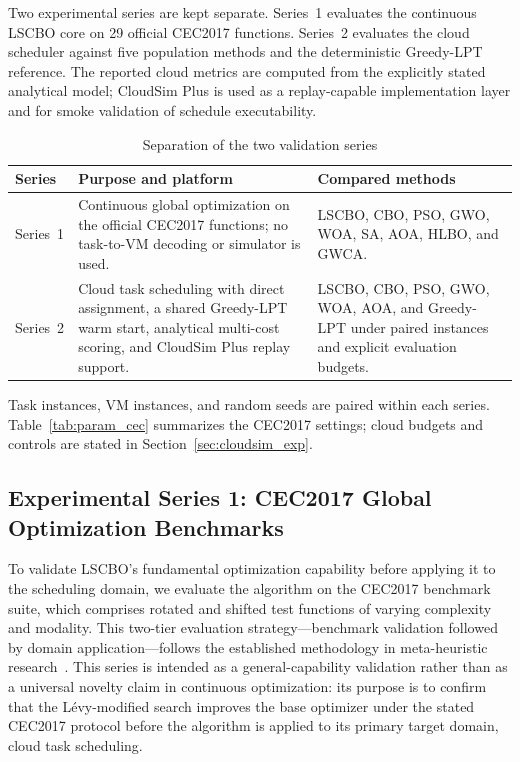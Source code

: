 \documentclass[pdflatex,onecolumn,sn-mathphys-num]{sn-jnl}
\begin{document}
Two experimental series are kept separate. Series~1 evaluates the continuous LSCBO core on 29 official CEC2017 functions. Series~2 evaluates the cloud scheduler against five population methods and the deterministic Greedy-LPT reference. The reported cloud metrics are computed from the explicitly stated analytical model; CloudSim Plus is used as a replay-capable implementation layer and for smoke validation of schedule executability.

\begin{table}[ht]
\centering
\caption{Separation of the two validation series}\label{tab:series_boundary}
\begin{tabular}{p{} p{} p{}}
\toprule
\textbf{Series} & \textbf{Purpose and platform} & \textbf{Compared methods} \\
\midrule
Series~1 & Continuous global optimization on the official CEC2017 functions; no task-to-VM decoding or simulator is used. & LSCBO, CBO, PSO, GWO, WOA, SA, AOA, HLBO, and GWCA. \\
\midrule
Series~2 & Cloud task scheduling with direct assignment, a shared Greedy-LPT warm start, analytical multi-cost scoring, and CloudSim Plus replay support. & LSCBO, CBO, PSO, GWO, WOA, AOA, and Greedy-LPT under paired instances and explicit evaluation budgets. \\
\bottomrule
\end{tabular}
\end{table}

Task instances, VM instances, and random seeds are paired within each series. Table~\ref{tab:param_cec} summarizes the CEC2017 settings; cloud budgets and controls are stated in Section~\ref{sec:cloudsim_exp}.

\subsection{Experimental Series 1: CEC2017 Global Optimization Benchmarks}\label{sec:cec2017}

To validate LSCBO's fundamental optimization capability before applying it to the scheduling domain, we evaluate the algorithm on the CEC2017 benchmark suite, which comprises rotated and shifted test functions of varying complexity and modality. This two-tier evaluation strategy---benchmark validation followed by domain application---follows the established methodology in meta-heuristic research~\cite{Mirjalili2016,Khatab2025}. This series is intended as a general-capability validation rather than as a universal novelty claim in continuous optimization: its purpose is to confirm that the L\'{e}vy-modified search improves the base optimizer under the stated CEC2017 protocol before the algorithm is applied to its primary target domain, cloud task scheduling.
\end{document}
